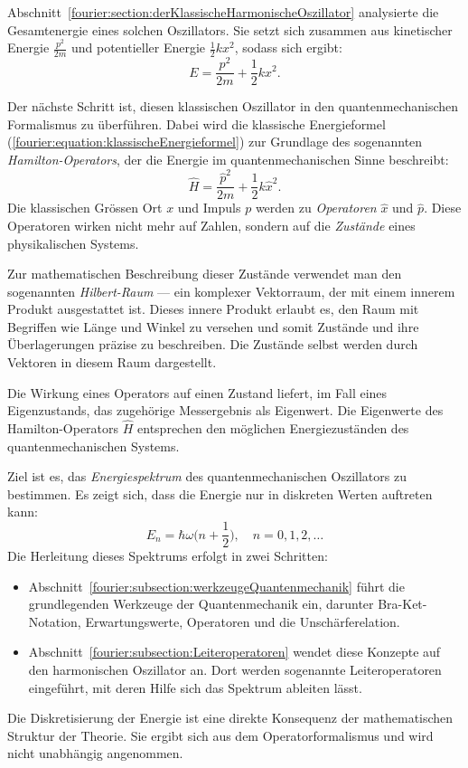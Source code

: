 Abschnitt~\ref{fourier:section:derKlassischeHarmonischeOszillator} analysierte die Gesamtenergie eines solchen Oszillators.
Sie setzt sich zusammen aus kinetischer Energie $\frac{p^2}{2m}$ und potentieller Energie $\frac{1}{2}kx^2$, sodass sich ergibt:
\begin{equation}\label{fourier:equation:klassischeEnergieformel}
E = \frac{p^2}{2m} + \frac{1}{2}kx^2.
\end{equation}

Der nächste Schritt ist, diesen klassischen Oszillator in den quantenmechanischen Formalismus zu überführen.
Dabei wird die klassische Energieformel (\ref{fourier:equation:klassischeEnergieformel}) zur Grundlage des sogenannten \emph{Hamilton-Operators}, der die Energie im quantenmechanischen Sinne beschreibt:
%
\begin{equation}
\hat{H} = \frac{\hat{p}^2}{2m} + \frac{1}{2} k \hat{x}^2.
\label{fourier:equation:hamiltonOperator}
\end{equation}
Die klassischen Grössen Ort $x$ und Impuls $p$ werden zu \emph{Operatoren} $\hat{x}$ und $\hat{p}$.
Diese Operatoren wirken nicht mehr auf Zahlen, sondern auf die \emph{Zustände} eines physikalischen Systems.

Zur mathematischen Beschreibung dieser Zustände verwendet man den sogenannten \emph{Hilbert-Raum} --- ein komplexer Vektorraum, der mit einem innerem Produkt ausgestattet ist.
%
Dieses innere Produkt erlaubt es, den Raum mit Begriffen wie Länge und Winkel zu versehen und somit Zustände und ihre Überlagerungen präzise zu beschreiben.
Die Zustände selbst werden durch Vektoren in diesem Raum dargestellt.

Die Wirkung eines Operators auf einen Zustand liefert, im Fall eines Eigenzustands, das zugehörige Messergebnis als Eigenwert.
Die Eigenwerte des Hamilton-Operators $\hat{H}$ entsprechen den möglichen Energiezuständen des quantenmechanischen Systems.

Ziel ist es, das \emph{Energiespektrum} des quantenmechanischen Oszillators zu bestimmen.
%
Es zeigt sich, dass die Energie nur in diskreten Werten auftreten kann:
\[
E_n = \hbar \omega \biggl(n + \frac{1}{2} \biggr), \quad n = 0, 1, 2, \dots
\]
Die Herleitung dieses Spektrums erfolgt in zwei Schritten:
\begin{itemize}
	\item Abschnitt~\ref{fourier:subsection:werkzeugeQuantenmechanik} führt die grundlegenden Werkzeuge der Quantenmechanik ein,
	darunter Bra-Ket-Notation, Erwartungswerte, Operatoren und die Unschärferelation.
	\item Abschnitt~\ref{fourier:subsection:Leiteroperatoren} wendet diese Konzepte auf den harmonischen Oszillator an.
	Dort werden sogenannte Leiteroperatoren eingeführt, mit deren Hilfe sich das Spektrum ableiten lässt.
\end{itemize}
Die Diskretisierung der Energie ist eine direkte Konsequenz der mathematischen Struktur der Theorie.
Sie ergibt sich aus dem Operatorformalismus und wird nicht unabhängig angenommen.


